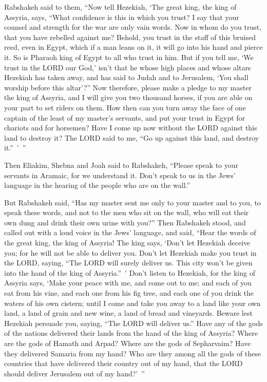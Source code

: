 \myverse{}Rabshakeh said to them, “Now tell Hezekiah, ‘The great king, the
king of Assyria, says, “What confidence is this in which you trust?
\myverse{}I say that your counsel and strength for the war are only vain words. Now in
whom do you trust, that you have rebelled against me?
\myverse{}Behold, you trust in the staff of this bruised reed, even in Egypt, which if
a man leans on it, it will go into his hand and pierce it. So is Pharaoh king of Egypt to all who trust
in him.
\myverse{}But if you tell me, ‘We trust in the LORD our God,’ isn’t that he whose high
places and whose altars Hezekiah has taken away, and has said to Judah and to Jerusalem, ‘You shall worship
before this altar’?”
\myverse{}Now therefore, please make a pledge to my master the king of Assyria, and I
will give you two thousand horses, if you are able on your part to set riders on them.
\myverse{}How then can you turn away the face of one captain of the least of my master’s
servants, and put your trust in Egypt for chariots and for horsemen?
\myverse{}Have I come up now without the LORD against this land to destroy it? The
LORD said to me, “Go up against this land, and destroy it.” ’ ”

\myverse{}Then Eliakim, Shebna and Joah said to Rabshakeh, “Please speak
to your servants in Aramaic, for we understand it. Don’t speak to us in the Jews’ language in the hearing
of the people who are on the wall.”

\myverse{}But Rabshakeh said, “Has my master sent me only to your master
and to you, to speak these words, and not to the men who sit on the wall, who will eat their own dung
and drink their own urine with you?”
\myverse{}Then Rabshakeh stood, and called out with a loud voice in the Jews’ language,
and said, “Hear the words of the great king, the king of Assyria!
\myverse{}The king says, ‘Don’t let Hezekiah deceive you; for he will not be able to
deliver you.
\myverse{}Don’t let Hezekiah make you trust in the LORD, saying, “The LORD will surely
deliver us. This city won’t be given into the hand of the king of Assyria.” ’
\myverse{}Don’t listen to Hezekiah, for the king of Assyria says, ‘Make your peace
with me, and come out to me; and each of you eat from his vine, and each one from his fig tree, and each
one of you drink the waters of his own cistern;
\myverse{}until I come and take you away to a land like your own land, a land of grain
and new wine, a land of bread and vineyards.
\myverse{}Beware lest Hezekiah persuade you, saying, “The LORD will deliver us.” Have
any of the gods of the nations delivered their lands from the hand of the king of Assyria?
\myverse{}Where are the gods of Hamath and Arpad? Where are the gods of Sepharvaim?
Have they delivered Samaria from my hand?
\myverse{}Who are they among all the gods of these countries that have delivered their
country out of my hand, that the LORD should deliver Jerusalem out of my hand?’ ”


